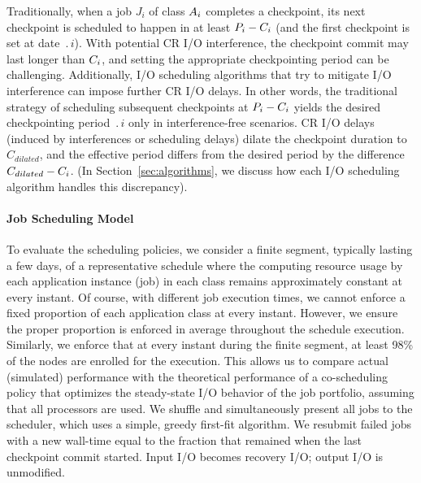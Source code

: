 Traditionally, when a job $J_{i}$ of class $A_{i}$ completes a checkpoint, its next
checkpoint is scheduled to happen in at least $P_{i}-C_{i}$ (and the first
checkpoint is set at date $\period{i}$). With potential CR I/O interference,
the checkpoint commit may last longer than $C_{i}$, and setting
the appropriate checkpointing period can be challenging.
Additionally, I/O scheduling algorithms that try to mitigate I/O interference can
impose further CR I/O delays.  In other words, the traditional strategy of scheduling
subsequent checkpoints at $P_{i}-C_{i}$ yields the desired checkpointing
period $\period{i}$ only in interference-free scenarios. CR I/O delays (induced by
interferences or scheduling delays) dilate the checkpoint duration to $C_{dilated}$,
and the effective period differs from the desired period by the difference
$C_{dilated}-C_{i}$.  (In Section~\ref{sec:algorithms}, we discuss how each I/O
scheduling algorithm handles this discrepancy).

\paragraph*{Job Scheduling Model}
To evaluate the scheduling policies, we consider a finite segment, typically lasting
a few days, of a representative schedule where the computing resource
usage by each application instance (job) in each class remains approximately constant at every instant. Of
course, with different job execution times, we cannot enforce a fixed proportion of
each application class at every instant. However, we ensure the proper proportion is
enforced in average throughout the schedule execution. Similarly, we enforce that at
every instant during the finite segment, at least 98\% of the nodes are enrolled for
the execution. This allows us to compare actual (simulated) performance with the
theoretical performance of a co-scheduling policy that optimizes the steady-state I/O
behavior of the job portfolio, assuming that all processors are used. We shuffle and
simultaneously present all jobs to the scheduler, which uses a simple, greedy
first-fit algorithm.  We resubmit failed jobs with a new wall-time equal to the
fraction that remained when the last checkpoint commit started. Input I/O becomes
recovery I/O; output I/O is unmodified.

